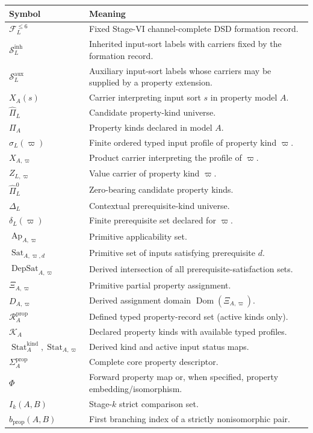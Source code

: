\documentclass[11pt]{article}
\newcommand{\FVI}{\mathcal F_{L}^{\le 6}}
\newcommand{\Sin}{\mathcal S_{L}^{\mathrm{inh}}}
\newcommand{\Saux}{\mathcal S_{L}^{\mathrm{aux}}}
\newcommand{\Pihat}{\widehat{\Pi}_{L}}
\newcommand{\PiZero}{\widehat{\Pi}_{L}^{0}}
\newcommand{\Dep}{\Delta_{L}}
\newcommand{\Ap}{\operatorname{Ap}}
\newcommand{\DepSat}{\operatorname{DepSat}}
\newcommand{\Sat}{\operatorname{Sat}}
\newcommand{\Dom}{\operatorname{Dom}}
\newcommand{\Stat}{\operatorname{Stat}}
\newcommand{\PropRec}{\mathcal R^{\mathrm{prop}}}
\theoremstyle{definition}
\theoremstyle{remark}
\begin{document}
\begin{tabularx}{\textwidth}{@{}>{\raggedright\arraybackslash}p{}X@{}}
\toprule
Symbol & Meaning\\
\midrule
\(\FVI\) & Fixed Stage-VI channel-complete DSD formation record.\\
\(\Sin\) & Inherited input-sort labels with carriers fixed by the formation record.\\
\(\Saux\) & Auxiliary input-sort labels whose carriers may be supplied by a property extension.\\
\(X_A(s)\) & Carrier interpreting input sort \(s\) in property model \(A\).\\
\(\Pihat\) & Candidate property-kind universe.\\
\(\Pi_A\) & Property kinds declared in model \(A\).\\
\(\sigma_L(\varpi)\) & Finite ordered typed input profile of property kind \(\varpi\).\\
\(X_{A,\varpi}\) & Product carrier interpreting the profile of \(\varpi\).\\
\(Z_{L,\varpi}\) & Value carrier of property kind \(\varpi\).\\
\(\PiZero\) & Zero-bearing candidate property kinds.\\
\(\Dep\) & Contextual prerequisite-kind universe.\\
\(\delta_L(\varpi)\) & Finite prerequisite set declared for \(\varpi\).\\
\(\Ap_{A,\varpi}\) & Primitive applicability set.\\
\(\Sat_{A,\varpi,d}\) & Primitive set of inputs satisfying prerequisite \(d\).\\
\(\DepSat_{A,\varpi}\) & Derived intersection of all prerequisite-satisfaction sets.\\
\(\Xi_{A,\varpi}\) & Primitive partial property assignment.\\
\(D_{A,\varpi}\) & Derived assignment domain \(\Dom(\Xi_{A,\varpi})\).\\
\(\PropRec_A\) & Defined typed property-record set (active kinds only).\\
\(\mathcal K_A\) & Declared property kinds with available typed profiles.\\
\(\Stat_A^{\mathrm{kind}},\Stat_{A,\varpi}\) & Derived kind and active input status maps.\\
\(\Sigma_A^{\mathrm{prop}}\) & Complete core property descriptor.\\
\(\Phi\) & Forward property map or, when specified, property embedding/isomorphism.\\
\(I_k(A,B)\) & Stage-\(k\) strict comparison set.\\
\(b_{\mathrm{prop}}(A,B)\) & First branching index of a strictly nonisomorphic pair.\\
\bottomrule
\end{tabularx}
\end{document}
